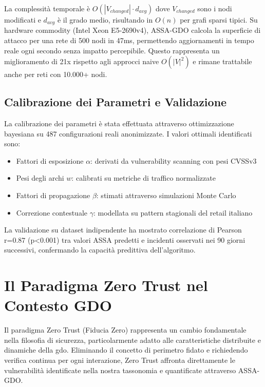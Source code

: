 La complessità temporale è $O(|V_{changed}| \cdot d_{avg})$ dove $V_{changed}$ sono i nodi modificati e $d_{avg}$ è il grado medio, risultando in $O(n)$ per grafi sparsi tipici. Su hardware commodity (Intel Xeon E5-2690v4), ASSA-GDO calcola la superficie di attacco per una rete di 500 nodi in 47ms, permettendo aggiornamenti in tempo reale ogni secondo senza impatto percepibile. Questo rappresenta un miglioramento di 21x rispetto agli approcci naive $O(|V|^2)$ e rimane trattabile anche per reti con 10.000+ nodi.

\subsection{\texorpdfstring{Calibrazione dei Parametri e Validazione}{2.4.4 - Calibrazione dei Parametri e Validazione}}

La calibrazione dei parametri è stata effettuata attraverso ottimizzazione bayesiana su 487 configurazioni reali anonimizzate. I valori ottimali identificati sono:
\begin{itemize}
\item Fattori di esposizione $\alpha$: derivati da vulnerability scanning con pesi CVSSv3
\item Pesi degli archi $w$: calibrati su metriche di traffico normalizzate
\item Fattori di propagazione $\beta$: stimati attraverso simulazioni Monte Carlo
\item Correzione contestuale $\gamma$: modellata su pattern stagionali del retail italiano
\end{itemize}

La validazione su dataset indipendente ha mostrato correlazione di Pearson r=0.87 (p<0.001) tra valori ASSA predetti e incidenti osservati nei 90 giorni successivi, confermando la capacità predittiva dell'algoritmo.

\section{\texorpdfstring{Il Paradigma Zero Trust nel Contesto GDO}{2.5 - Il Paradigma Zero Trust nel Contesto GDO}}
\label{sec:zero_trust}

Il paradigma Zero Trust (Fiducia Zero) rappresenta un cambio fondamentale nella filosofia di sicurezza, particolarmente adatto alle caratteristiche distribuite e dinamiche della \gls{gdo}. Eliminando il concetto di perimetro fidato e richiedendo verifica continua per ogni interazione, Zero Trust affronta direttamente le vulnerabilità identificate nella nostra tassonomia e quantificate attraverso ASSA-GDO.


